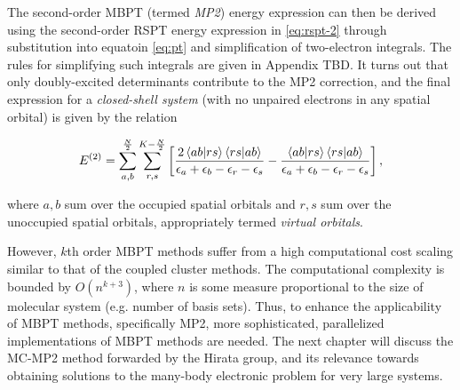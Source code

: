 The second-order MBPT (termed \emph{MP2}) energy expression can then be derived
using the second-order RSPT energy expression in \ref{eq:rspt-2} through
substitution into equatoin \ref{eq:pt} and simplification of two-electron
integrals. The rules for simplifying such integrals are given in Appendix TBD.
It turns out that only doubly-excited determinants contribute to the MP2
correction, and the final expression for a \emph{closed-shell system} (with no
unpaired electrons in any spatial orbital) is given by the relation

\begin{equation}
	\perturbE[]{2} =
	\sum_{a,b}^{\frac{N}{2}} \sum_{r,s}^{K - \frac{N}{2}}
	\left[
	\frac{2\braket{ab|rs}\braket{rs|ab}}{\eps_a + \eps_b - \eps_r -\eps_s}
	-
	\frac{\braket{ab|rs}\braket{rs|ab}}{\eps_a + \eps_b - \eps_r -\eps_s}
	\right],
\end{equation}

\noindent where $a,b$ sum over the occupied spatial orbitals and $r,s$ sum over
the unoccupied spatial orbitals, appropriately termed \emph{virtual orbitals}.

However, $k$th order MBPT methods suffer from a high computational cost scaling
similar to that of the coupled cluster methods. The computational complexity is
bounded by $O(n^{k+3})$, where $n$ is some measure proportional to the size of
molecular system (e.g. number of basis sets). \cite{mbpt-book} Thus, to enhance
the applicability of MBPT methods, specifically MP2, more sophisticated,
parallelized implementations of MBPT methods are needed. The next chapter will
discuss the MC-MP2 method forwarded by the Hirata group, and its relevance
towards obtaining solutions to the many-body electronic problem for very large
systems.
